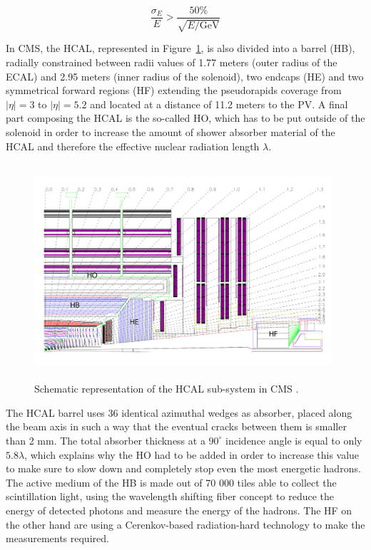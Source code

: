 \documentclass[a4paper, 10pt, openright]{report}
\begin{document}
\begin{equation}
\label{eq:HCALRes}
\frac{\sigma_E}{E} > \frac{50\%}{\sqrt{E/\text{GeV}}}
\end{equation}

In \ac{CMS}, the \ac{HCAL}, represented in Figure~\ref{fig:CMSHCAL}, is also divided into a barrel (HB), radially constrained between radii values of 1.77 meters (outer radius of the \ac{ECAL}) and 2.95 meters (inner radius of the solenoid), two endcaps (HE) and two symmetrical forward regions (HF) extending the pseudorapids coverage from $|\eta| = 3$ to $|\eta| = 5.2$ and located at a distance of 11.2 meters to the \ac{PV}. A final part composing the \ac{HCAL} is the so-called \ac{HO}, which has to be put outside of the solenoid in order to increase the amount of shower absorber material of the \ac{HCAL} and therefore the effective nuclear radiation length $\lambda$.

\begin{figure}[htbp]
\begin{center}
\includegraphics[width=11cm, height=8cm]{figs/CMSHCAL.png}
\caption{Schematic representation of the \ac{HCAL} sub-system in \ac{CMS} \cite{CMSDescription}.}
\label{fig:CMSHCAL}
\end{center}
\end{figure}

The \ac{HCAL} barrel uses 36 identical azimuthal wedges as absorber, placed along the beam axis in such a way that the eventual cracks between them is smaller than 2 mm. The total absorber thickness at a $90^{\circ}$ incidence angle is equal to only $5.8 \lambda$, which explains why the \ac{HO} had to be added in order to increase this value to make sure to slow down and completely stop even the most energetic hadrons. The active medium of the HB is made out of 70 000 tiles able to collect the scintillation light, using the wavelength shifting fiber concept to reduce the energy of detected photons and measure the energy of the hadrons. The HF on the other hand are using a Cerenkov-based radiation-hard technology to make the measurements required.
\end{document}
